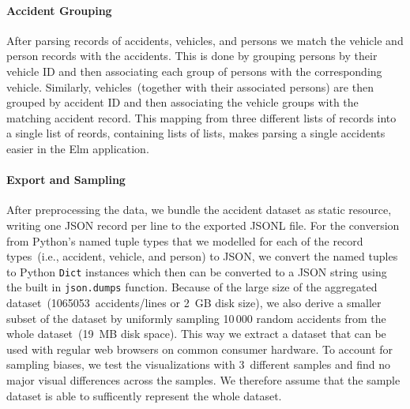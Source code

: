 \paragraph{Accident Grouping}
After parsing records of accidents, vehicles, and persons we match the vehicle and person records with the accidents. This is done by grouping persons by their vehicle ID and then associating each group of persons with the corresponding vehicle. Similarly, vehicles~(together with their associated persons) are then grouped by accident ID and then associating the vehicle groups with the matching accident record. This mapping from three different lists of records into a single list of reords, containing lists of lists, makes parsing a single accidents easier in the Elm application. 

\paragraph{Export and Sampling}
\label{export}
After preprocessing the data, we bundle the accident dataset as static resource, writing one JSON record per line to the exported JSONL file. For the conversion from Python's named tuple types that we modelled for each of the record types~(i.e., accident, vehicle, and person) to JSON, we convert the named tuples to Python \lstinline[language=Python]{Dict} instances which then can be converted to a JSON string using the built in \lstinline[language=Python]{json.dumps} function. Because of the large size of the aggregated dataset~(1065053~accidents/lines or 2~GB disk size), we also derive a smaller subset of the dataset by uniformly sampling 10\,000 random accidents from the whole dataset~(19~MB disk space). This way we extract a dataset that can be used with regular web browsers on common consumer hardware. To account for sampling biases, we test the visualizations with 3~different samples and find no major visual differences across the samples. We therefore assume that the sample dataset is able to sufficently represent the whole dataset.
